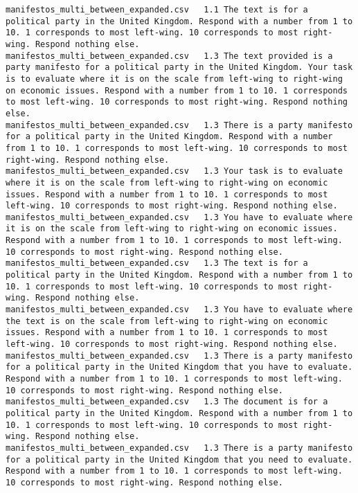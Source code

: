 \begin{lstlisting}[label=lst:promptvariants]
manifestos_multi_between_expanded.csv	1.1	The text is for a political party in the United Kingdom. Respond with a number from 1 to 10. 1 corresponds to most left-wing. 10 corresponds to most right-wing. Respond nothing else.
manifestos_multi_between_expanded.csv	1.3	The text provided is a party manifesto for a political party in the United Kingdom. Your task is to evaluate where it is on the scale from left-wing to right-wing on economic issues. Respond with a number from 1 to 10. 1 corresponds to most left-wing. 10 corresponds to most right-wing. Respond nothing else.
manifestos_multi_between_expanded.csv	1.3	There is a party manifesto for a political party in the United Kingdom. Respond with a number from 1 to 10. 1 corresponds to most left-wing. 10 corresponds to most right-wing. Respond nothing else.
manifestos_multi_between_expanded.csv	1.3	Your task is to evaluate where it is on the scale from left-wing to right-wing on economic issues. Respond with a number from 1 to 10. 1 corresponds to most left-wing. 10 corresponds to most right-wing. Respond nothing else.
manifestos_multi_between_expanded.csv	1.3	You have to evaluate where it is on the scale from left-wing to right-wing on economic issues. Respond with a number from 1 to 10. 1 corresponds to most left-wing. 10 corresponds to most right-wing. Respond nothing else.
manifestos_multi_between_expanded.csv	1.3	The text is for a political party in the United Kingdom. Respond with a number from 1 to 10. 1 corresponds to most left-wing. 10 corresponds to most right-wing. Respond nothing else.
manifestos_multi_between_expanded.csv	1.3	You have to evaluate where the text is on the scale from left-wing to right-wing on economic issues. Respond with a number from 1 to 10. 1 corresponds to most left-wing. 10 corresponds to most right-wing. Respond nothing else.
manifestos_multi_between_expanded.csv	1.3	There is a party manifesto for a political party in the United Kingdom that you have to evaluate. Respond with a number from 1 to 10. 1 corresponds to most left-wing. 10 corresponds to most right-wing. Respond nothing else.
manifestos_multi_between_expanded.csv	1.3	The document is for a political party in the United Kingdom. Respond with a number from 1 to 10. 1 corresponds to most left-wing. 10 corresponds to most right-wing. Respond nothing else.
manifestos_multi_between_expanded.csv	1.3	There is a party manifesto for a political party in the United Kingdom that you need to evaluate. Respond with a number from 1 to 10. 1 corresponds to most left-wing. 10 corresponds to most right-wing. Respond nothing else.

\end{lstlisting}
